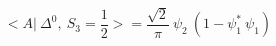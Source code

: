 \begin{equation}
<A|~\Delta^{0},~ S_3=\frac{1}{2} >= \frac{\sqrt{2}}{\pi} ~\psi_2~(1-\psi_1^*~\psi_1)
\end{equation}

